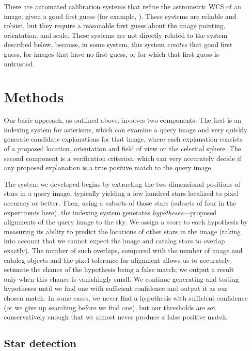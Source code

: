 \documentclass[12pt,preprint]{aastex}
\renewcommand{\%}{\percent}
\begin{document}
There are automated calibration systems that refine the astrometric
WCS of an image, given a good first guess (for example,
\citealt{valdes, mink, bertin}).  These systems are reliable and
robust, but they require a reasonable first guess about the image
pointing, orientation, and scale.  These systems are not directly
related to the system described below, because, in some system, this
system \emph{creates} that good first guess, for images that have no
first guess, or for which that first guess is untrusted.

\section{Methods}

Our basic approach, as outlined above, involves two components.  The
first is an indexing system for asterisms, which can examine a query
image and very quickly generate candidate explanations for that image,
where each explanation consists of a proposed location, orientation
and field of view on the celestial sphere.  The second component is a
verification criterion, which can very accurately decide if any
proposed explanation is a true positive match to the query image.

The system we developed begins by extracting the two-dimensional
positions of stars in a query image, typically yielding a few hundred
stars localized to pixel accuracy or better.  Then, using a subsets of
those stars (subsets of four in the experiments here), the indexing
system generates \emph{hypotheses}---proposed alignments of the query
image to the sky.  We assign a score to each hypothesis by measuring
its ability to predict the locations of other stars in the image
(taking into account that we cannot expect the image and catalog stars
to overlap exactly). The number of such overlaps, compared with the
number of image and catalog objects and the pixel tolerance for
alignment allows us to accurately estimate the chance of the
hypothesis being a false match; we output a result only when this
chance is vanishingly small.  We continue generating and testing
hypotheses until we find one with sufficient confidence and output it
as our chosen match.  In some cases, we never find a hypothesis with
sufficient confidence (or we give up searching before we find one), but
our thresholds are set conservatively enough that we almost never
produce a false positive match.

\subsection{Star detection}
\end{document}
